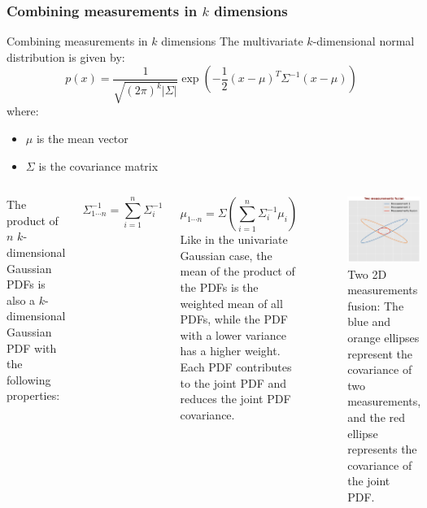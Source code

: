 \subsubsection{Combining measurements in $k$ dimensions}
\begin{frame}{Combining measurements in $k$ dimensions}
The multivariate \( k \)-dimensional normal distribution is given by:
\begin{equation*}
p(x) = \frac{1}{\sqrt{(2\pi)^k |\Sigma|}} \exp \left( -\frac{1}{2} (x - \mu)^T \Sigma^{-1} (x - \mu) \right)
\end{equation*}
where:
\begin{itemize}
    \item \( \mu \) is the mean vector
    \item \( \Sigma \) is the covariance matrix
\end{itemize}

\begin{columns}
    The product of \( n \) \( k \)-dimensional Gaussian PDFs is also a \( k \)-dimensional Gaussian PDF with the following properties:

\begin{equation*}
\Sigma^{-1}_{1 \cdots n} = \sum_{i=1}^{n} \Sigma^{-1}_i
\end{equation*}

\begin{equation*}
\mu_{1 \cdots n} = \Sigma \left( \sum_{i=1}^{n} \Sigma^{-1}_i \mu_i \right)
\end{equation*}
Like in the univariate Gaussian case, the mean of the product of the PDFs is the weighted mean of all PDFs, while the PDF with a lower variance has a higher weight. 
    Each PDF contributes to the joint PDF and reduces the joint PDF covariance.
    \begin{figure}
        \centering
        \includegraphics[width=0.5\linewidth]{Figures//Part4/Two2DMeasurementsFusion.png}
        \vspace{-10pt}
        \caption{Two 2D measurements fusion: The blue and orange ellipses represent the covariance of two measurements, and the red ellipse represents the covariance of the joint PDF.}
    \end{figure}

\end{columns}

\end{frame}


